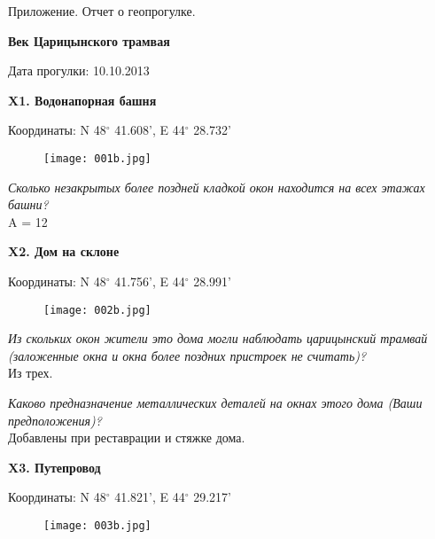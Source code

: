 \documentclass[pscyr]{hedwork}
\begin{document}
  \maketitle
  
  \newpage
  
  \begin{center}
    \large Приложение. Отчет о геопрогулке.

    \bf Век Царицынского трамвая
  \end{center}
  \begin{flushright}
    Дата прогулки: 10.10.2013
  \end{flushright}

  \textbf{X1. Водонапорная башня}

  Координаты: N 48\( ^\circ \) 41.608', E 44\( ^\circ \) 28.732'

  \begin{figure}[h!]
    \center
    \texttt{[image: 001b.jpg]}
  \end{figure}

  \emph{Сколько незакрытых более поздней кладкой окон находится на всех
  этажах башни?} \\
  A = 12

  \newpage

  \textbf{X2. Дом на склоне}

  Координаты: N 48\( ^\circ \) 41.756', E 44\( ^\circ \) 28.991'

  \begin{figure}[h!]
    \center
    \texttt{[image: 002b.jpg]}
  \end{figure}

  \emph{Из скольких окон жители это дома могли наблюдать царицынский трамвай
  (заложенные окна и окна более поздних пристроек не считать)?} \\
  Из трех.

  \emph{Каково предназначение металлических деталей на окнах этого дома
  (Ваши предположения)?} \\
  Добавлены при реставрации и стяжке дома.

  \newpage

  \textbf{X3. Путепровод}

  Координаты: N 48\( ^\circ \) 41.821', E 44\( ^\circ \) 29.217'

  \begin{figure}[h!]
    \center
    \texttt{[image: 003b.jpg]}
  \end{figure}
\end{document}
